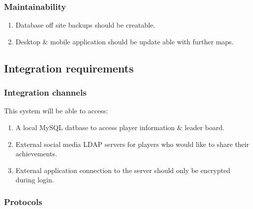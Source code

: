 \documentclass[letterpaper]{article}
\begin{document}
			\subsubsection*{Maintainability}
			\vspace{0.1in}
			
			\begin{enumerate}
				\item Database off site backups should be creatable.
				\item Desktop \& mobile application should be update able with further maps.
			\end{enumerate}
			
		
		\vspace{0.2in}
		
		\subsection*{Integration requirements}
		
		\vspace{0.1in}
		
		\subsubsection*{Integration channels}
			\vspace{0.1in}
			
			This system will be able to access:
			\begin{enumerate}
				\item A local MySQL datbase to access player information \& leader board.
				\item External social media LDAP servers for players who would like to share their achievements.
				\item External application connection to the server should only be encrypted during login.
			\end{enumerate}
		
			\vspace{0.2in}
			\subsubsection*{Protocols}
			\vspace{0.1in}
		
\end{document}
